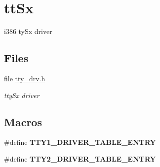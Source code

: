 \hypertarget{group__i386__tty}{}\section{tt\+Sx}
\label{group__i386__tty}


i386 ty\+Sx driver  


\subsection*{Files}
\begin{DoxyCompactItemize}
\item 
file \mbox{\hyperlink{tty__drv_8h}{tty\+\_\+drv.\+h}}
\begin{DoxyCompactList}\small\item\em tty\+Sx driver \end{DoxyCompactList}\end{DoxyCompactItemize}
\subsection*{Macros}
\begin{DoxyCompactItemize}
\item 
\#define {\bfseries T\+T\+Y1\+\_\+\+D\+R\+I\+V\+E\+R\+\_\+\+T\+A\+B\+L\+E\+\_\+\+E\+N\+T\+RY}
\item 
\#define {\bfseries T\+T\+Y2\+\_\+\+D\+R\+I\+V\+E\+R\+\_\+\+T\+A\+B\+L\+E\+\_\+\+E\+N\+T\+RY}
\end{DoxyCompactItemize}
